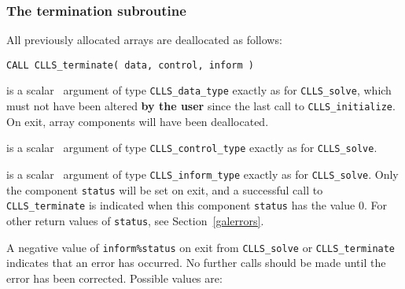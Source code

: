 \documentclass{galahad}
\newcommand{\packagename}{CLLS}
\begin{document}

\subsubsection{The  termination subroutine}
All previously allocated arrays are deallocated as follows:
\vspace*{1mm}

\hspace{8mm}
{\tt CALL \packagename\_terminate( data, control, inform )}

\vspace*{-3mm}
\begin{description}

 is a scalar \intentinout\ argument of type
{\tt \packagename\_data\_type}
exactly as for
{\tt \packagename\_solve},
which must not have been altered {\bf by the user} since the last call to
{\tt \packagename\_initialize}.
On exit, array components will have been deallocated.

 is a scalar \intentin\ argument of type
{\tt \packagename\_control\_type}
exactly as for
{\tt \packagename\_solve}.

 is a scalar \intentout\ argument of type
{\tt \packagename\_inform\_type}
exactly as for
{\tt \packagename\_solve}.
Only the component {\tt status} will be set on exit, and a
successful call to
{\tt \packagename\_terminate}
is indicated when this  component {\tt status} has the value 0.
For other return values of {\tt status}, see Section~\ref{galerrors}.

\end{description}



\galerrors
A negative value of {\tt inform\%status} on exit from
{\tt \packagename\_solve}
or
{\tt \packagename\_terminate}
indicates that an error has occurred. No further calls should be made
until the error has been corrected. Possible values are:
\end{document}
